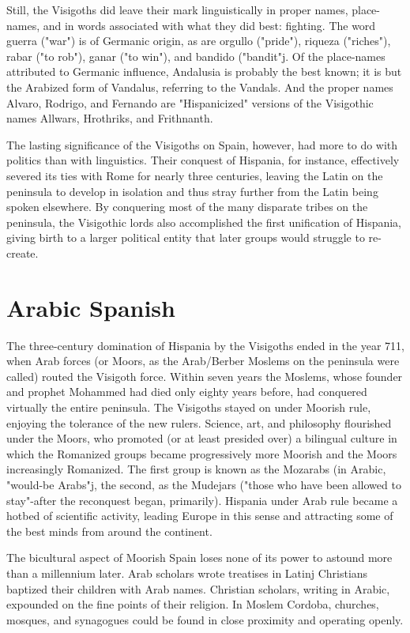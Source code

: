 Still, the Visigoths did leave their mark linguistically in proper
names, place-names, and in words associated with what they did best:
fighting. The word guerra ("war") is of Germanic origin, as are orgullo
("pride"), riqueza ("riches"), rabar ("to rob"), ganar ("to win"), and
bandido ("bandit"j. Of the place-names attributed to Germanic influence, Andalusia is probably the best known; it is but the Arabized
form of Vandalus, referring to the Vandals. And the proper names Alvaro, Rodrigo, and Fernando are "Hispanicized" versions of the Visigothic names Allwars, Hrothriks, and Frithnanth.

The lasting significance of the Visigoths on Spain, however,
had more to do with politics than with linguistics. Their conquest of
Hispania, for instance, effectively severed its ties with Rome for nearly
three centuries, leaving the Latin on the peninsula to develop in isolation and thus stray further from the Latin being spoken elsewhere. By
conquering most of the many disparate tribes on the peninsula, the
Visigothic lords also accomplished the first unification of Hispania,
giving birth to a larger political entity that later groups would struggle
to re-create.

\section{Arabic Spanish}

The three-century domination of Hispania by the Visigoths
ended in the year 711, when Arab forces (or Moors, as the Arab/Berber
Moslems on the peninsula were called) routed the Visigoth force.
Within seven years the Moslems, whose founder and prophet Mohammed had died only eighty years before, had conquered virtually the entire peninsula. The Visigoths stayed on under Moorish rule, enjoying
the tolerance of the new rulers. Science, art, and philosophy flourished
under the Moors, who promoted (or at least presided over) a bilingual
culture in which the Romanized groups became progressively more
Moorish and the Moors increasingly Romanized. The first group is
known as the Mozarabs (in Arabic, "would-be Arabs"j, the second, as
the Mudejars ("those who have been allowed to stay"-after the reconquest began, primarily). Hispania under Arab rule became a hotbed of
scientific activity, leading Europe in this sense and attracting some of
the best minds from around the continent.

The bicultural aspect of Moorish Spain loses none of its power
to astound more than a millennium later. Arab scholars wrote treatises
in Latinj Christians baptized their children with Arab names. Christian scholars, writing in Arabic, expounded on the fine points of their
religion. In Moslem Cordoba, churches, mosques, and synagogues
could be found in close proximity and operating openly.

